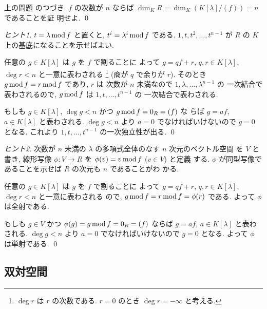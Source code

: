 \documentclass[12pt,twoside]{jarticle}
\begin{document}

\begin{question}[10点]
  \label{q:K[x]/(f)-2}
  上の問題  のつづき.
  $f$ の次数が $n$ ならば $\dim_K R=\dim_K(K[\lambda]/(f))=n$ であることを証
  明せよ. \qed
\end{question}

\begin{proof}[ヒント1]
  $t=\lambda\mathop{\mathrm{mod}}\nolimits f$ と置くと, $t^i=\lambda^i\mathop{\mathrm{mod}}\nolimits f$ である.
  $1,t,t^2,\ldots,t^{n-1}$ が $R$ の $K$ 上の基底になることを示せばよい.

  任意の $g\in K[\lambda]$ は $g$ を $f$ で割ることに
  よって $g=qf+r$, $q,r\in K[\lambda]$, $\deg r<n$ と一意に表わされる%
  \footnote{$\deg r$ は $r$ の次数である.
    $r=0$ のとき $\deg r = -\infty$ と考える.}
  (商が $q$ で余りが $r$).
  そのとき $g\mathop{\mathrm{mod}}\nolimits f=r\mathop{\mathrm{mod}}\nolimits f$ であり, $r$ は
  次数が $n$ 未満なので $1,\lambda,\ldots,\lambda^{n-1}$ の
  一次結合で表わされるので, $g\mathop{\mathrm{mod}}\nolimits f$ は $1,t,\ldots,t^{n-1}$ の
  一次結合で表わされる.

  もしも $g\in K[\lambda]$, $\deg g<n$ かつ $g\mathop{\mathrm{mod}}\nolimits f=0_R=(f)$ な
  らば $g=af$, $a\in K[\lambda]$ と表わされる.
  $\deg g<n$ より $a=0$ でなければいけないので $g=0$ となる.  
  これより $1,t,\ldots,t^{n-1}$ の一次独立性が出る.
  \qed
\end{proof}

\begin{proof}[ヒント2]
  次数が $n$ 未満の $\lambda$ の多項式全体のなす $n$ 次元のベクトル空間
  を $V$ と書き, 線形写像 $\phi:V\to R$ を $\phi(v)=v\mathop{\mathrm{mod}}\nolimits f$ ($v\in V$) と定義
  する.  $\phi$ が同型写像であることを示せば $R$ の次元も $n$ であることがわ
  かる.

  任意の $g\in K[\lambda]$ は $g$ を $f$ で割ることに
  よって $g=qf+r$, $q,r\in K[\lambda]$, $\deg r<n$ と一意に表わされる
  ので, $g\mathop{\mathrm{mod}}\nolimits f=r\mathop{\mathrm{mod}}\nolimits f=\phi(r)$ である.  よって $\phi$ は全射である.

  もしも $g\in V$ かつ $\phi(g) = g\mathop{\mathrm{mod}}\nolimits f=0_R=(f)$ 
  ならば $g=af$, $a\in K[\lambda]$ と表わされる.
  $\deg g<n$ より $a=0$ でなければいけないので $g=0$ となる.  
  よって $\phi$ は単射である.
  \qed
\end{proof}


\subsection{双対空間}
\label{sec:dual-space}
\end{document}
